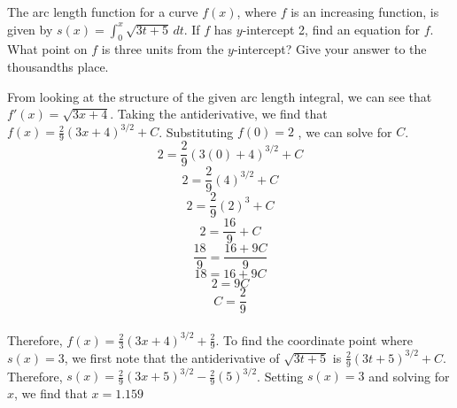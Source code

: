 \begin{Exercise}[label=defint5]
The arc length function for a curve $f(x)$, where $f$ is an increasing 
function, is given by $s(x) = \int_{0}^{x} \sqrt{3t + 5}\,dt$. If $f$ 
has $y$-intercept 2, find an equation for $f$. What point on $f$ is 
three units from the $y$-intercept? Give your answer to the thousandths 
place. 
\end{Exercise}

\begin{Answer}[ref=defint5]
From looking at the structure of the given arc length integral, we can 
see that $f'(x) = \sqrt{3x + 4}$. Taking the antiderivative, we find 
that $f(x) = \frac{2}{9}(3x + 4)^{3 / 2} + C$. Substituting $f(0) = 2$
, we can solve for $C$. $$2 = \frac{2}{9}(3(0) + 4)^{3 / 2} + C$$ 
$$2 = \frac{2}{9}(4)^{3 / 2} + C$$ 
$$2 = \frac{2}{9}(2)^3 + C$$ 
$$2 = \frac{16}{9} + C$$ 
$$\frac{18}{9} = \frac{16 + 9C}{9}$$ 
$$18 = 16 + 9C$$ 
$$2 = 9C$$ 
$$C = \frac{2}{9}$$\\ 
Therefore, $f(x) = \frac{2}{3}(3x + 4)^{3 / 2} + \frac{2}{9}$. To find 
the coordinate point where $s(x) = 3$, we first note that the 
antiderivative of $\sqrt{3t + 5}$ is $\frac{2}{9}(3t + 5)^{3 / 2} + C$. 
Therefore, $s(x) = \frac{2}{9}(3x + 5)^{3 / 2} - \frac{2}{9}(5)^{3 / 2}$. 
Setting $s(x) = 3$ and solving for $x$, we find that $x = 1.159$
\end{Answer}